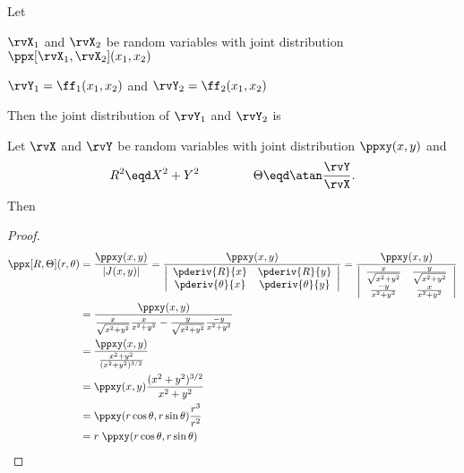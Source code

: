 \begin{theorem}
\label{thm:x1x2->y1y2}
Let
\begin{liste}
  \item $\rvX_1$ and $\rvX_2$ be random variables with joint distribution
        $\ppx[\rvX_1,\rvX_2](x_1,x_2)$
  \item $\rvY_1=\ff_1(x_1,x_2)$ and $\rvY_2=\ff_2(x_1,x_2)$
\end{liste}
Then the joint distribution of $\rvY_1$ and $\rvY_2$ is
\end{theorem}

\begin{proposition}
\label{prop:XY->RT}
Let $\rvX$ and $\rvY$ be random variables with joint distribution
$\ppxy(x,y)$ and
\[ R^2 \eqd X^2 + Y^2 \hspace{10ex} \Theta \eqd \atan\frac{\rvY}{\rvX}. \]
Then
\end{proposition}
\begin{proof}
\begin{align*}
  \ppx[R,\Theta](r,\theta)
    &= \frac{\ppxy(x,y)}{|J(x,y)|}
     =  \frac{\ppxy(x,y)}{
        \left|\begin{array}{cc}
          \pderiv{R}{x}      & \pderiv{R}{y}   \\
          \pderiv{\theta}{x} & \pderiv{\theta}{y}
        \end{array}\right|
        }
     =  \frac{\ppxy(x,y)}{
        \left|\begin{array}{cc}
          \frac{ x}{\sqrt{x^2+y^2}}  & \frac{y}{\sqrt{x^2+y^2}}   \\
          \frac{-y}{x^2+y^2}         & \frac{x}{x^2+y^2}
        \end{array}\right|
        }
  \\&= \frac{\ppxy(x,y)}{
         \frac{x}{\sqrt{x^2+y^2}}\frac{x}{x^2+y^2}  -
         \frac{y}{\sqrt{x^2+y^2}}\frac{-y}{x^2+y^2}
       }
  \\&= \frac{\ppxy(x,y)}{
         \frac{x^2+y^2}{(x^2+y^2)^{3/2}}
       }
  \\&= \ppxy(x,y)\frac{(x^2+y^2)^{3/2}}{x^2+y^2}
  \\&= \ppxy(r\cos\theta,r\sin\theta)\frac{r^3}{r^2}
  \\&= r\;\ppxy(r\cos\theta,r\sin\theta)
\end{align*}
\end{proof}


